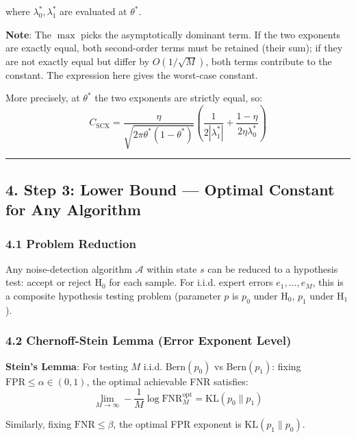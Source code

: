 \documentclass[
  12pt,
]{ctexart}
\begin{document}
where \(\lambda_0^*, \lambda_1^*\) are evaluated at \(\theta^*\).

\textbf{Note}: The \(\max\) picks the asymptotically dominant term. If the two exponents are exactly equal, both second-order terms must be retained (their sum); if they are not exactly equal but differ by \(O(1/\sqrt{M})\), both terms contribute to the constant. The expression here gives the worst-case constant.

More precisely, at \(\theta^*\) the two exponents are strictly equal, so:
\[C_{\text{SCX}} = \frac{\eta}{\sqrt{2\pi\theta^*(1-\theta^*)}} \left(\frac{1}{2|\lambda_1^*|} + \frac{1-\eta}{2\eta\lambda_0^*}\right)\]

\begin{center}\rule{0.5\linewidth}{0.5pt}\end{center}

\subsection{4. Step 3: Lower Bound --- Optimal Constant for Any Algorithm}\label{step-3-lower-bound-optimal-constant-for-any-algorithm}

\subsubsection{4.1 Problem Reduction}\label{problem-reduction}

Any noise-detection algorithm \(\mathcal{A}\) within state \(s\) can be reduced to a hypothesis test: accept or reject H\(_0\) for each sample. For i.i.d. expert errors \(e_1, \dots, e_M\), this is a composite hypothesis testing problem (parameter \(p\) is \(p_0\) under H\(_0\), \(p_1\) under H\(_1\)).

\subsubsection{4.2 Chernoff-Stein Lemma (Error Exponent Level)}\label{chernoff-stein-lemma-error-exponent-level}

\textbf{Stein's Lemma}: For testing \(M\) i.i.d. \(\text{Bern}(p_0)\) vs \(\text{Bern}(p_1)\): fixing \(\text{FPR} \leq \alpha \in (0,1)\), the optimal achievable FNR satisfies:
\[\lim_{M\to\infty} -\frac{1}{M}\log \text{FNR}_M^{\text{opt}} = \text{KL}(p_0 \| p_1)\]

Similarly, fixing \(\text{FNR} \leq \beta\), the optimal FPR exponent is \(\text{KL}(p_1 \| p_0)\).
\end{document}
